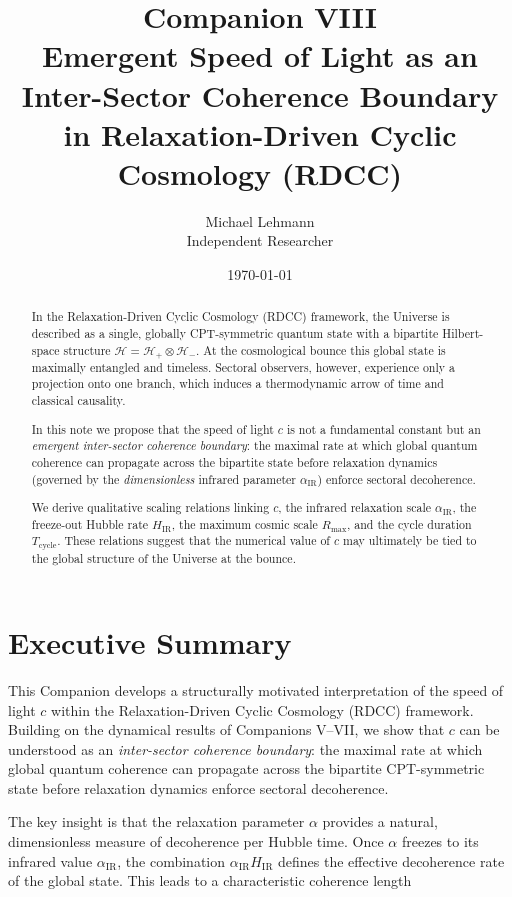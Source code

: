 \documentclass[11pt,a4paper]{article}
\title{%
  \textbf{Companion VIII}\\[8pt]
  {\Large Emergent Speed of Light as an Inter-Sector Coherence Boundary}\\[4pt]
  {\Large in Relaxation-Driven Cyclic Cosmology (RDCC)}
}
\author{
Michael Lehmann \\ Independent Researcher
}
\date{\today}
\begin{document}
\maketitle

\begin{abstract}
In the Relaxation-Driven Cyclic Cosmology (RDCC) framework, the Universe is described as a single, globally CPT-symmetric quantum state with a bipartite Hilbert-space structure 
\(\mathcal{H} = \mathcal{H}_+ \otimes \mathcal{H}_-\).
At the cosmological bounce this global state is maximally entangled and timeless. 
Sectoral observers, however, experience only a projection onto one branch, which induces a thermodynamic arrow of time and classical causality.

In this note we propose that the speed of light \(c\) is not a fundamental constant but an \emph{emergent inter-sector coherence boundary}: the maximal rate at which global quantum coherence can propagate across the bipartite state before relaxation dynamics (governed by the \emph{dimensionless} infrared parameter \(\alpha_{\mathrm{IR}}\)) enforce sectoral decoherence. 

We derive qualitative scaling relations linking \(c\), the infrared relaxation scale \(\alpha_{\mathrm{IR}}\), the freeze-out Hubble rate \(H_{\mathrm{IR}}\), the maximum cosmic scale \(R_{\max}\), and the cycle duration \(T_{\text{cycle}}\). These relations suggest that the numerical value of \(c\) may ultimately be tied to the global structure of the Universe at the bounce.
\end{abstract}


\section*{Executive Summary}

This Companion develops a structurally motivated interpretation of the speed of light \(c\) within the Relaxation-Driven Cyclic Cosmology (RDCC) framework. Building on the dynamical results of Companions V–VII, we show that \(c\) can be understood as an \emph{inter-sector coherence boundary}: the maximal rate at which global quantum coherence can propagate across the bipartite CPT-symmetric state before relaxation dynamics enforce sectoral decoherence.

The key insight is that the relaxation parameter \(\alpha\) provides a natural, dimensionless measure of decoherence per Hubble time. Once \(\alpha\) freezes to its infrared value \(\alpha_{\mathrm{IR}}\), the combination \(\alpha_{\mathrm{IR}} H_{\mathrm{IR}}\) defines the effective decoherence rate of the global state. This leads to a characteristic coherence length
\end{document}
